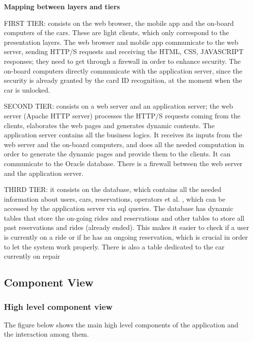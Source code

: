 \documentclass{article}
\begin{document}
\begin{flushleft}
\textbf{Mapping between layers and tiers}
\begin{description}
\item FIRST TIER: consists on the web browser, the mobile app and the on-board computers of the cars. These are light clients, which only correspond to the presentation layers. The web browser and mobile app communicate to the web server, sending HTTP/S requests and receiving the HTML, CSS, JAVASCRIPT responses;  they need to get through a firewall in order to enhance security. The on-board computers directly communicate with the application server, since the security is already granted by the card ID recognition, at the moment when the car is unlocked.
\item SECOND TIER: consists on a web server and an application server; the web server (Apache HTTP server) processes the HTTP/S requests coming from the clients, elaborates the web pages and generates dynamic contents. The application server contains all the business logics. It receives its inputs from the web server and the on-board computers, and does all the needed computation in order to generate the dynamic pages and  provide them 
to the clients. It can communicate to the Oracle database. There is a firewall between the web server and the application server.
\item THIRD TIER:  it consists on the database, which contains all the needed information about users, cars, reservations, operators et al. , which can be accessed by the application server via sql queries. The database has dynamic tables that store the on-going rides and reservations  and other tables to store all past reservations and rides (already ended). This makes it easier to check if a user is currently on a ride or if he has an ongoing reservation, which is crucial in order to let the system work properly.
There is also a table dedicated to the car currently on repair


\end{description}







\subsection{Component View}  %
\subsubsection{High level component view} %
The figure below shows the main high level components of the application and the interaction among them.
\vspace{1.5cm}



\end{flushleft}
\end{document}
